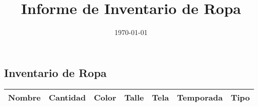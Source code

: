 \documentclass[a4paper,12pt]{article}
\title{Informe de Inventario de Ropa}
\author{}
\date{\today}
\begin{document}
\maketitle
\begin{landscape}
\section*{Inventario de Ropa}
\begin{longtable}{p{3cm}|p{2cm}|p{2cm}|p{2cm}|p{2cm}|p{3cm}|p{2cm}}
\toprule
\textbf{Nombre} & \textbf{Cantidad} & \textbf{Color} & \textbf{Talle} & \textbf{Tela} & \textbf{Temporada} & \textbf{Tipo} \\
\midrule
\endhead
\bottomrule
\end{longtable}
\end{landscape}
\end{document}
